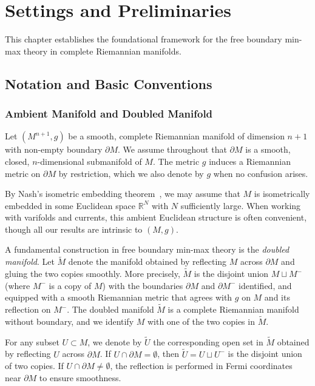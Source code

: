 \chapter{Settings and Preliminaries}\label{ch:examples}

This chapter establishes the foundational framework for the free boundary min-max theory in complete Riemannian manifolds.

\section{Notation and Basic Conventions}\label{sec:notation}

\subsection{Ambient Manifold and Doubled Manifold}\label{subsec:ambient-manifold}

Let $(M^{n+1}, g)$ be a smooth, complete Riemannian manifold of dimension $n+1$ with non-empty boundary $\partial M$. We assume throughout that $\partial M$ is a smooth, closed, $n$-dimensional submanifold of $M$. The metric $g$ induces a Riemannian metric on $\partial M$ by restriction, which we also denote by $g$ when no confusion arises.

By Nash's isometric embedding theorem~\cite{Nash56}, we may assume that $M$ is isometrically embedded in some Euclidean space $\mathbb{R}^N$ with $N$ sufficiently large. When working with varifolds and currents, this ambient Euclidean structure is often convenient, though all our results are intrinsic to $(M, g)$.

A fundamental construction in free boundary min-max theory is the \emph{doubled manifold}. Let
$\widetilde{M}$ denote the manifold obtained by reflecting $M$ across $\partial M$ and gluing the two
copies smoothly. More precisely, $\widetilde{M}$ is the disjoint union $M \sqcup M^-$ (where $M^-$ is
a copy of $M$) with the boundaries $\partial M$ and $\partial M^-$ identified, and equipped with a
smooth Riemannian metric that agrees with $g$ on $M$ and its reflection on $M^-$. The doubled manifold
$\widetilde{M}$ is a complete Riemannian manifold without boundary, and we identify $M$ with one of the
two copies in $\widetilde{M}$.

\begin{notation}
For any subset $U \subset M$, we denote by $\widetilde{U}$ the corresponding open set in $\widetilde{M}$
obtained by reflecting $U$ across $\partial M$. If $U \cap \partial M = \emptyset$, then
$\widetilde{U} = U \sqcup U^-$ is the disjoint union of two copies. If $U \cap \partial M \neq \emptyset$,
the reflection is performed in Fermi coordinates near $\partial M$ to ensure smoothness.
\end{notation}

